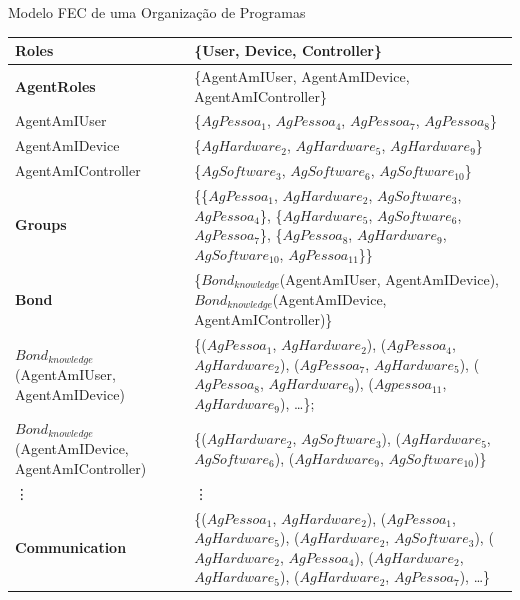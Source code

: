 \begin{section}{Modelo FEC de uma Organização de Programas}
\begin{table}[h!]
{\begin{tabular}{| p{5cm} | p{10cm}|}
            \textbf{Roles} & \{User, Device, Controller\}                                       \\ \hline
            
            \textbf{AgentRoles} & \{AgentAmIUser, AgentAmIDevice, AgentAmIController\}   \\ \hline
            
            AgentAmIUser & \{$AgPessoa_1$, $AgPessoa_4$, $AgPessoa_7$, $AgPessoa_8$\}   \\ \hline
            
            AgentAmIDevice & \{$AgHardware_2$, $AgHardware_5$, $AgHardware_9$\}         \\ \hline
            
            AgentAmIController & \{$AgSoftware_3$, $AgSoftware_6$, $AgSoftware_{10}$\}  \\ \hline
             
              
            \textbf{Groups} & \{\{$AgPessoa_1$, $AgHardware_2$, $AgSoftware_3$, $AgPessoa_4$\}, \{$AgHardware_5$, $AgSoftware_6$, $AgPessoa_7$\}, \{$AgPessoa_8$, $AgHardware_9$, $AgSoftware_{10}$, $AgPessoa_{11}$\}\} \\ \hline 
            
            \textbf{Bond} & \{$Bond_{knowledge}$(AgentAmIUser, AgentAmIDevice), \newline $Bond_{knowledge}$(AgentAmIDevice, AgentAmIController)\}    \\ \hline
            
             $Bond_{knowledge}$(AgentAmIUser, AgentAmIDevice) & \{($AgPessoa_1$, $AgHardware_2$), ($AgPessoa_4$, $AgHardware_2$), ($AgPessoa_7$, $AgHardware_5$), ($AgPessoa_8$, $AgHardware_9$), ($Agpessoa_{11}$, $AgHardware_9$), \dots \};  \\ \hline
        
             $Bond_{knowledge}$(AgentAmIDevice, AgentAmIController) & \{($AgHardware_2$, $AgSoftware_3$), ($AgHardware_5$, $AgSoftware_6$), ($AgHardware_9$, $AgSoftware_{10}$)\}  \\ \hline
             
             \vdots & \vdots \\ \hline

            \textbf{Communication} & \{($AgPessoa_1$, $AgHardware_2$), ($AgPessoa_1$, $AgHardware_5$), ($AgHardware_2$, $AgSoftware_3$), ($AgHardware_2$, $AgPessoa_4$), ($AgHardware_2$, $AgHardware_5$), ($AgHardware_2$, $AgPessoa_7$), \ldots \} \\ \hline
            

\end{tabular}}
\end{table}
\end{section}
